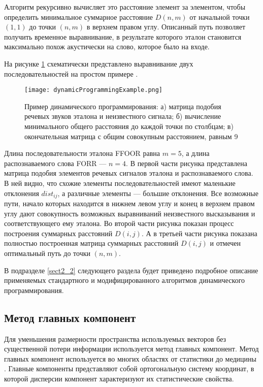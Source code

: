 Алгоритм рекурсивно вычисляет это расстояние элемент за элементом, чтобы определить минимальное суммарное расстояние $D(n, m)$ от начальной точки $(1, 1)$ до точки $(n, m)$ в верхнем правом углу.
Описанный путь позволяет получить временное выравнивание, в результате которого эталон становится максимально похож акустически на слово, которое было на входе.

На рисунке \ref{fig:dynamicProgrammingExample} схематически представлено выравнивание двух последовательностей на простом примере \cite{lea1980trends, gawali2010marathi}.

\begin{figure}[h]
	\centering
	\texttt{[image: dynamicProgrammingExample.png]}
	\caption{Пример динамического программирования: а) матрица подобия речевых звуков эталона и неизвестного сигнала; б) вычисление минимального общего расстояния до каждой точки по столбцам; в) окончательная матрица с общим совокупным расстоянием, равным 9}
	\label{fig:dynamicProgrammingExample}
\end{figure}

Длина последовательности эталона FFOOR равна $m = 5$, а длина распознаваемого слова FORR --- $n = 4$.
В первой части рисунка представлена матрица подобия элементов речевых сигналов эталона и распознаваемого слова.
В ней видно, что схожие элементы последовательностей имеют маленькие отклонения $dist_{ij}$, а различные элементы --- большие отклонения.
Все возможные пути, начало которых находится в нижнем левом углу и конец в верхнем правом углу дают совокупность возможных выравниваний неизвестного высказывания и соответствующего ему эталона.
Во второй части рисунка показан процесс построения суммарных расстояний $D(i, j)$.
А в третьей части рисунка показана полностью построенная матрица суммарных расстояний $D(i, j)$ и отмечен оптимальный путь до точки $(n, m)$.

В подразделе \ref{sect2_2} следующего раздела будет приведено подробное описание применяемых стандартного и модифицированного алгоритмов динамического программирования.


\subsection{Метод главных компонент} \label{sect1_4_3}

Для уменьшения размерности пространства используемых векторов без существенной потери информации используется метод главных компонент.
Метод главных компонент используется во многих областях от статистики до медицины \cite{aivazyan1989prikladnaya}.
Главные компоненты представляют собой ортогональную систему координат, в которой дисперсии компонент характеризуют их статистические свойства.

